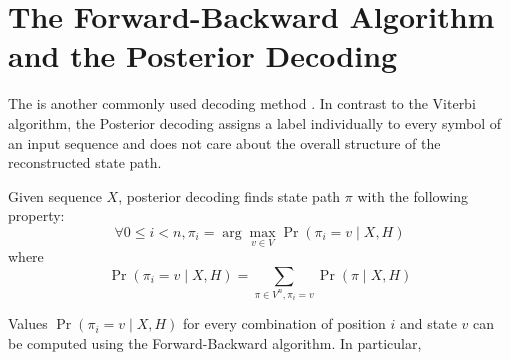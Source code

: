 \section{The Forward-Backward Algorithm and  the Posterior Decoding}

The  is another commonly used decoding method
\cite{Kall2005, Durbin1998}. In contrast to the Viterbi algorithm, the
Posterior decoding assigns a label individually to every symbol of an input
sequence and does not care about the overall structure of the reconstructed
state path. 

Given sequence $X$, posterior decoding finds state path $\pi$ with the following
property:
\[\forall 0\leq i< n, \pi_i=\arg\max_{v\in V}\Pr\left(\pi_i=v\mid X,H\right) \]
where \[\Pr\left(\pi_i=v\mid X,H\right) = \sum_{\pi\in V^n,\pi_i=v}\Pr\left(\pi\mid X,H\right)\]

Values $\Pr\left(\pi_i=v\mid X,H\right)$ for every
combination of position $i$ and state $v$ can be computed using the Forward-Backward
algorithm. In particular,


